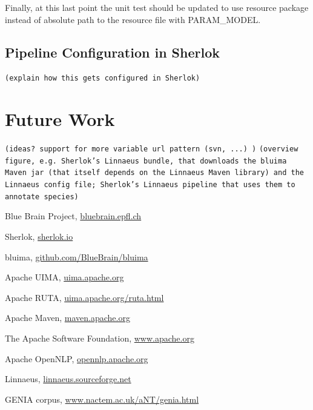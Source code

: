 \documentclass{article}
\newcommand{\ID}[1]{{\textsc{#1}}}
\newcommand{\TODO}[1]{\texttt{\textcolor{YellowOrange}{(#1)}}} %
\begin{document}
Finally, at this last point the unit test should be updated to use resource package instead of
absolute path to the resource file with \ID{PARAM\_MODEL}.

\subsection{Pipeline Configuration in Sherlok}

\TODO{explain how this gets configured in Sherlok}


\section{Future Work}

\TODO{ideas? support for more variable url pattern (svn, ...) }
\TODO{overview figure, e.g.  Sherlok's Linnaeus bundle, that downloads the bluima Maven jar (that itself depends on the Linnaeus Maven library) and the Linnaeus config file; Sherlok's Linnaeus pipeline that uses them to annotate species}

\begin{thebibliography}{99}

    Blue Brain Project,
    \href{http://bluebrain.epfl.ch/}{bluebrain.epfl.ch}

    Sherlok,
    \href{http://sherlok.io}{sherlok.io}

    bluima,
    \href{https://github.com/BlueBrain/bluima}{github.com/BlueBrain/bluima}

    Apache UIMA,
    \href{https://uima.apache.org/}{uima.apache.org}

    Apache RUTA,
    \href{https://uima.apache.org/ruta.html}{uima.apache.org/ruta.html}

    Apache Maven,
    \href{https://maven.apache.org/}{maven.apache.org}

    The Apache Software Foundation,
    \href{http://www.apache.org/}{www.apache.org}

    Apache OpenNLP,
    \href{https://opennlp.apache.org/}{opennlp.apache.org}

    Linnaeus,
    \href{http://linnaeus.sourceforge.net/}{linnaeus.sourceforge.net}

    GENIA corpus,
    \href{http://www.nactem.ac.uk/aNT/genia.html}{www.nactem.ac.uk/aNT/genia.html}


\end{thebibliography}

\begin{appendix}
  \listoffigures
  \listoftables
\end{appendix}
\end{document}
